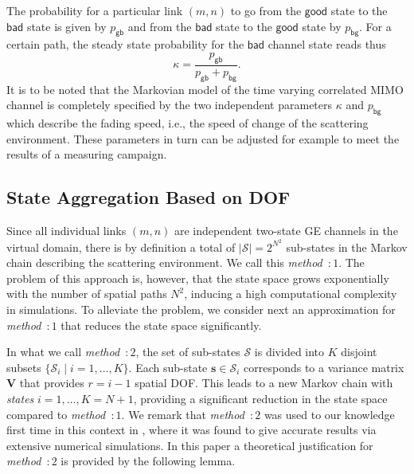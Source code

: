 \documentclass[10pt,conference]{IEEEtran}
\newcommand{\rankH}{r}
\begin{document}
The probability for a particular link $(m,n)$ to go from the $\mathsf{good}$ state to the $\mathsf{bad}$ state is given by $p_{\mathsf{gb}}$ and from the $\mathsf{bad}$ state to the $\mathsf{good}$ state by $p_{\mathsf{bg}}$.  For a certain path, the steady state probability for the $\mathsf{bad}$ channel state reads thus
\begin{equation}
\kappa=\frac{p_{\mathsf{gb}} } { p_{\mathsf{gb}}+p_{\mathsf{bg}} }   .
\label{eq:block_error_prob}
\end{equation}
It is to be noted that the Markovian model of the time varying correlated MIMO channel is completely specified by the two independent parameters $\kappa$ and $p_{\mathsf{bg}}$ which describe the fading speed, i.e., the speed of change of the scattering environment. These parameters in turn
can be adjusted for example to meet the results of a measuring campaign.



\subsection{State Aggregation Based on DOF}
\label{subsec:StateAggBasedonDOF}

Since all individual links $(m,n)$ are independent two-state GE channels in the virtual domain, there is by definition a total of $|\mathcal{S}| = 2^{N^{2}}$ sub-states in the Markov chain describing the scattering environment.
We call this  \emph{method~$:1$}. The problem of this approach is, however, that the state space grows exponentially with the number of spatial paths $N^{2}$, inducing a high computational complexity in simulations.  To alleviate the problem, we consider next an approximation for \emph{method~$:1$} that reduces the state space significantly.



In what we call \emph{method~$:2$}, the set of sub-states $\mathcal{S}$ is divided into $K$ disjoint subsets $\{\mathcal{S}_{i} \mid i = 1,\ldots,K\}$.  Each sub-state $\mathbf{s}\in\mathcal{S}_{i}$  corresponds to a variance matrix $\mathbf{V}$ that provides $\rankH = i-1$ spatial DOF.  This leads to a new Markov chain with
\emph{states} $i=1,\ldots,K=N+1$, providing a significant reduction in the state space compared to \emph{method~$:1$}.
We remark that \emph{method~$:2$} was used to our knowledge first time in this context in \cite{MIMO:QoS:FSM:Kashif}, where it was found to give accurate results via extensive numerical simulations. In this paper a theoretical justification for \emph{method~$:2$} is provided by the following lemma.
\end{document}
